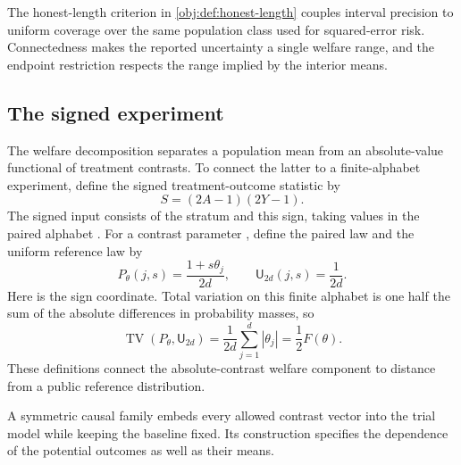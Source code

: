 The honest-length criterion  in \cref{obj:def:honest-length} couples interval precision to uniform coverage over the same population class used for squared-error risk. Connectedness makes the reported uncertainty a single welfare range, and the endpoint restriction respects the range implied by the interior means.

\subsection{The signed experiment}

The welfare decomposition separates a population mean from an absolute-value functional of treatment contrasts. To connect the latter to a finite-alphabet experiment, define the signed treatment-outcome statistic  by
\[
S=(2A-1)(2Y-1).
\]
The signed input consists of the stratum and this sign, taking values in the paired alphabet . For a contrast parameter , define the paired law  and the uniform reference law  by
\[
P_\theta(j,s)=\frac{1+s\theta_j}{2d},
\qquad
\mathsf U_{2d}(j,s)=\frac1{2d}.
\]
Here  is the sign coordinate. Total variation on this finite alphabet is one half the sum of the absolute differences in probability masses, so
\[
\operatorname{TV}(P_\theta,\mathsf U_{2d})
=\frac1{2d}\sum_{j=1}^d|\theta_j|
=\frac12F(\theta).
\]
These definitions connect the absolute-contrast welfare component to distance from a public reference distribution.

A symmetric causal family embeds every allowed contrast vector into the trial model while keeping the baseline fixed. Its construction specifies the dependence of the potential outcomes as well as their means.

